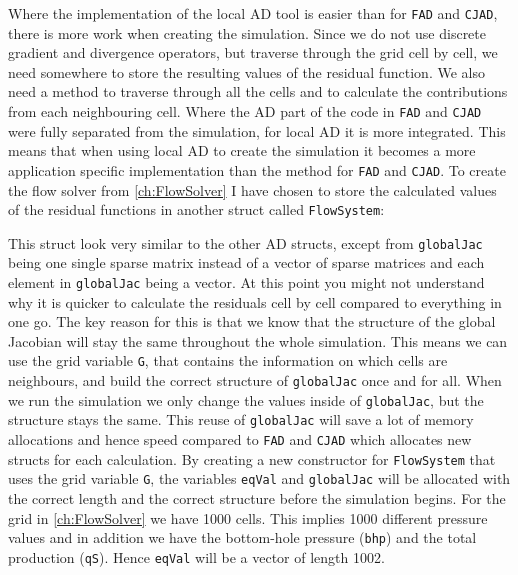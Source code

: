 Where the implementation of the local AD tool is easier than for \texttt{FAD} and \texttt{CJAD}, there is more work when creating the simulation. Since we do not use discrete gradient and divergence operators, but traverse through the grid cell by cell, we need somewhere to store the resulting values of the residual function. We also need a method to traverse through all the cells and to calculate the contributions from each neighbouring cell. Where the AD part of the code in \texttt{FAD} and \texttt{CJAD} were fully separated from the simulation, for local AD it is more integrated. This means that when using local AD to create the simulation it becomes a more application specific implementation than the method for \texttt{FAD} and \texttt{CJAD}. To create the flow solver from \autoref{ch:FlowSolver} I have chosen to store the calculated values of the residual functions in another struct called \texttt{FlowSystem}:

This struct look very similar to the other AD structs, except from \texttt{globalJac} being one single sparse matrix instead of a vector of sparse matrices and each element in \texttt{globalJac} being a vector. At this point you might not understand why it is quicker to calculate the residuals cell by cell compared to everything in one go. The key reason for this is that we know that the structure of the global Jacobian will stay the same throughout the whole simulation. This means we can use the grid variable \texttt{G}, that contains the information on which cells are neighbours, and build the correct structure of \texttt{globalJac} once and for all. When we run the simulation we only change the values inside of \texttt{globalJac}, but the structure stays the same. This reuse of \texttt{globalJac} will save a lot of memory allocations and hence speed compared to \texttt{FAD} and \texttt{CJAD} which allocates new structs for each calculation. By creating a new constructor for \texttt{FlowSystem} that uses the grid variable \texttt{G}, the variables \texttt{eqVal} and \texttt{globalJac} will be allocated with the correct length and the correct structure before the simulation begins. For the grid in \autoref{ch:FlowSolver} we have 1000 cells. This implies 1000 different pressure values and in addition we have the bottom-hole pressure (\texttt{bhp}) and the total production (\texttt{qS}). Hence \texttt{eqVal} will be a vector of length 1002.

